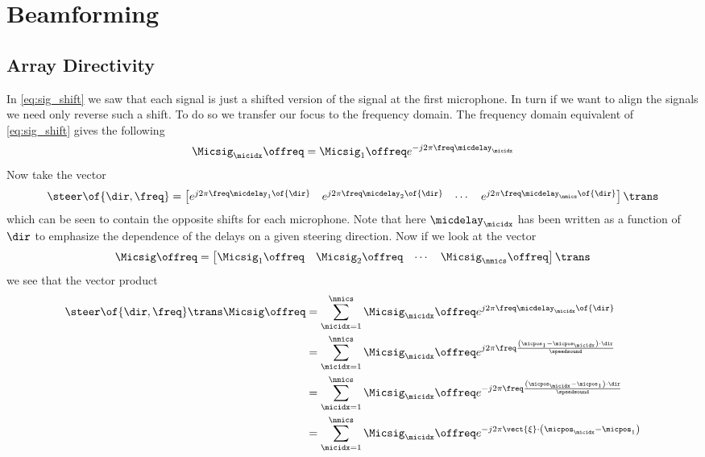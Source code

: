 \documentclass{uiucecethesis09}
\begin{document}
  \section{Beamforming}

    \subsection{Array Directivity}
      In \eqref{eq:sig_shift} we saw that each signal is just a shifted version 
      of the signal at the first microphone. In turn if we want to align the 
      signals we need only reverse such a shift. To do so we transfer our focus 
      to the frequency domain.
      The frequency domain equivalent of \eqref{eq:sig_shift} gives the 
      following
      \begin{equation} \label{eq:freq_shift} \Micsig_\micidx\offreq = 
        \Micsig_1\offreq e^{-j2\pi\freq\micdelay_\micidx}
        \end{equation}
      Now take the vector
      \begin{equation} \label{eq:steering_vec}
        \steer\of{\dir, \freq} =
        \begin{bmatrix} e^{j2\pi\freq\micdelay_1\of{\dir}} & 
          e^{j2\pi\freq\micdelay_2\of{\dir}} & \cdots & 
          e^{j2\pi\freq\micdelay_\nmics\of{\dir}}
        \end{bmatrix}\trans
      \end{equation}
      which can be seen to contain the opposite shifts for each microphone. Note 
      that here $\micdelay_\micidx$ has been written as a function of $\dir$ to 
      emphasize the dependence of the delays on a given steering direction. Now 
      if we look at the vector
      \begin{equation}
        \Micsig\offreq = \begin{bmatrix} \Micsig_1\offreq & \Micsig_2\offreq 
          & \cdots & \Micsig_\nmics\offreq \end{bmatrix}\trans
      \end{equation}
      we see that the vector product
      \begin{align}
        \steer\of{\dir, \freq}\trans \Micsig\offreq &= 
        \sum\limits_{\micidx=1}^{\nmics} \Micsig_\micidx\offreq 
        e^{j2\pi\freq\micdelay_\micidx\of{\dir}} \\
        &= \sum\limits_{\micidx=1}^{\nmics} \Micsig_\micidx\offreq 
        e^{j2\pi\freq\frac{\left(\micpos_1 - \micpos_\micidx\right) \cdot 
        \dir}{\speedsound}} \\
        &= \sum\limits_{\micidx=1}^{\nmics} \Micsig_\micidx\offreq 
        e^{-j2\pi\freq\frac{\left(\micpos_\micidx - \micpos_1\right) \cdot 
        \dir}{\speedsound}} \\
        &= \sum\limits_{\micidx=1}^{\nmics} \Micsig_\micidx\offreq 
        e^{-j2\pi\vect{\xi} \cdot \left(\micpos_\micidx - \micpos_1\right)}
      \end{align}
\end{document}
